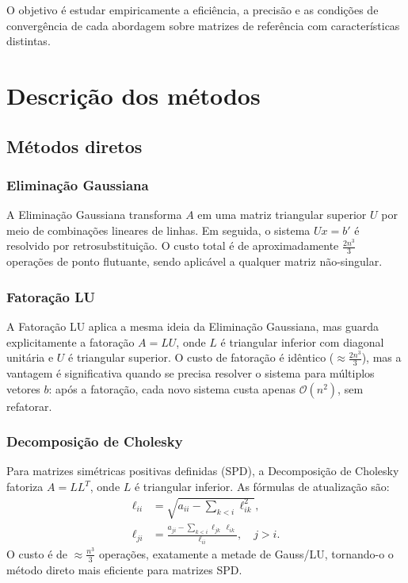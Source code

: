 \documentclass[12pt, a4paper]{article}
\begin{document}
O objetivo é estudar empiricamente a eficiência, a precisão e as condições de
convergência de cada abordagem sobre matrizes de referência com características
distintas.
 
\section{Descrição dos métodos}
 
\subsection{Métodos diretos}
 
\subsubsection{Eliminação Gaussiana}
 
A Eliminação Gaussiana transforma $A$ em uma matriz triangular superior $U$ por meio
de combinações lineares de linhas. Em seguida, o sistema $Ux = b'$ é resolvido por
retrosubstituição. O custo total é de aproximadamente $\frac{2n^3}{3}$ operações de
ponto flutuante, sendo aplicável a qualquer matriz não-singular.
 
\subsubsection{Fatoração LU}
 
A Fatoração LU aplica a mesma ideia da Eliminação Gaussiana, mas guarda explicitamente
a fatoração $A = LU$, onde $L$ é triangular inferior com diagonal unitária e $U$ é
triangular superior. O custo de fatoração é idêntico ($\approx \frac{2n^3}{3}$), mas a
vantagem é significativa quando se precisa resolver o sistema para múltiplos vetores
$b$: após a fatoração, cada novo sistema custa apenas $\mathcal{O}(n^2)$, sem refatorar.
 
\subsubsection{Decomposição de Cholesky}
 
Para matrizes simétricas positivas definidas (SPD), a Decomposição de Cholesky
fatoriza $A = LL^T$, onde $L$ é triangular inferior. As fórmulas de atualização são:
\begin{align}
  \ell_{ii} &= \sqrt{a_{ii} - \sum_{k < i} \ell_{ik}^2}, \label{eq:chol_diag} \\
  \ell_{ji} &= \frac{a_{ji} - \sum_{k < i} \ell_{jk}\,\ell_{ik}}{\ell_{ii}},
    \quad j > i. \label{eq:chol_off}
\end{align}
O custo é de $\approx \frac{n^3}{3}$ operações, exatamente a metade de Gauss/LU,
tornando-o o método direto mais eficiente para matrizes SPD.
 
\end{document}
